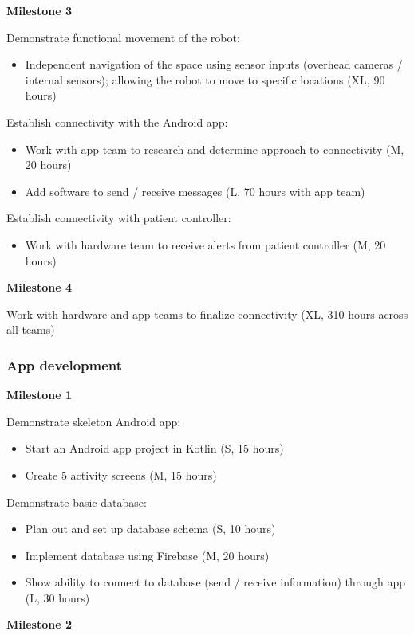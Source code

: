 \documentclass{article}
\begin{document}
{\bf Milestone 3}

Demonstrate functional movement of the robot:
\begin{itemize}
\item Independent navigation of the space using sensor inputs (overhead cameras / internal sensors); allowing the robot to move to specific locations (XL, 90 hours)
\end{itemize}

Establish connectivity with the Android app:
\begin{itemize}
\item Work with app team to research and determine approach to connectivity (M, 20 hours)
\item Add software to send / receive messages (L, 70 hours with app team)
\end{itemize}

Establish connectivity with patient controller:
\begin{itemize}
\item Work with hardware team to receive alerts from patient controller (M, 20 hours)
\end{itemize}

{\bf Milestone 4}

Work with hardware and app teams to finalize connectivity (XL, 310 hours across all teams)


\subsubsection{App development}

{\bf Milestone 1}

Demonstrate skeleton Android app:
\begin{itemize}
\item Start an Android app project in Kotlin (S, 15 hours)
\item Create 5 activity screens (M, 15 hours)
\end{itemize}

Demonstrate basic database:
\begin{itemize}
\item Plan out and set up database schema (S, 10 hours)
\item Implement database using Firebase (M, 20 hours)
\item Show ability to connect to database (send / receive information) through app (L, 30 hours)
\end{itemize}

{\bf Milestone 2}
\end{document}
